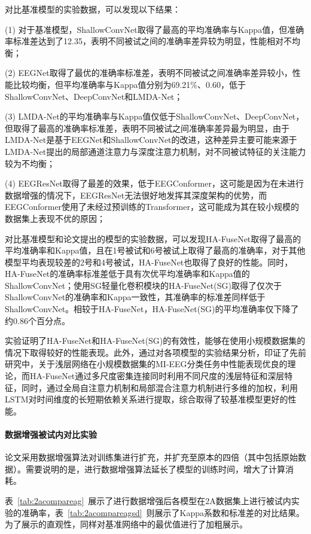 对比基准模型的实验数据，可以发现以下结果：

(1) 对于基准模型，ShallowConvNet取得了最高的平均准确率与Kappa值，但准确率标准差达到了12.35，表明不同被试之间的准确率差异较为明显，性能相对不均衡；

(2) EEGNet取得了最优的准确率标准差，表明不同被试之间准确率差异较小，性能比较均衡，但平均准确率与Kappa值分别为69.21\%、0.60，低于ShallowConvNet、DeepConvNet和LMDA-Net；

(3) LMDA-Net的平均准确率与Kappa值仅低于ShallowConvNet、DeepConvNet，但取得了最高的准确率标准差，表明不同被试之间准确率差异最为明显，由于LMDA-Net是基于EEGNet和ShallowConvNet的改进，这种差异主要可能来源于LMDA-Net提出的局部通道注意力与深度注意力机制，对不同被试特征的关注能力较为不均衡；

(4) EEGResNet取得了最差的效果，低于EEGConformer，这可能是因为在未进行数据增强的情况下，EEGResNet无法很好地发挥其深度架构的优势，而EEGConformer使用了未经过预训练的Transformer，这可能成为其在较小规模的数据集上表现不优的原因；

对比基准模型和论文提出的模型的实验数据，可以发现HA-FuseNet取得了最高的平均准确率和Kappa值，且在1号被试和6号被试上取得了最高的准确率，对于其他模型平均表现较差的2号和4号被试，HA-FuseNet也取得了良好的性能。同时，HA-FuseNet的准确率标准差低于具有次优平均准确率和Kappa值的ShallowConvNet；使用SG轻量化卷积模块的HA-FuseNet(SG)取得了仅次于ShallowConvNet的准确率和Kappa一致性，其准确率的标准差同样低于ShallowConvNet。相较于HA-FuseNet，HA-FuseNet(SG)的平均准确率仅下降了约0.86个百分点。

实验证明了HA-FuseNet和HA-FuseNet(SG)的有效性，能够在使用小规模数据集的情况下取得较好的性能表现。此外，通过对各项模型的实验结果分析，印证了先前研究中，关于浅层网络在小规模数据集的MI-EEG分类任务中性能表现优良的理论，而HA-FuseNet通过多尺度密集连接同时利用不同尺度的浅层特征和深层特征，同时，通过全局自注意力机制和局部混合注意力机制进行多维的加权，利用LSTM对时间维度的长短期依赖关系进行提取，综合取得了较基准模型更好的性能。

\paragraph{数据增强被试内对比实验}

论文采用数据增强算法对训练集进行扩充，并扩充至原本的四倍（其中包括原始数据）。需要说明的是，进行数据增强算法延长了模型的训练时间，增大了计算消耗。

表~\ref{tab:2acompareag}~展示了进行数据增强后各模型在2A数据集上进行被试内实验的准确率，表~\ref{tab:2acompareagsd}~则展示了Kappa系数和标准差的对比结果。为了展示的直观性，同样对基准网络中的最优值进行了加粗展示。

